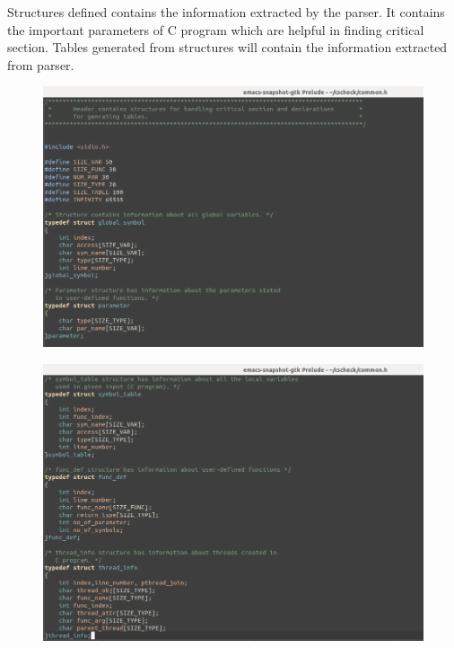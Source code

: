 Structures defined contains the information extracted by the parser.		
It contains the important parameters of C program which are helpful		
in finding critical section. Tables generated from structures will		
contain the information extracted from parser.	
\begin{figure}[H]
\centering
\includegraphics[scale=0.4]{Snaps/common_1.png}
\label{<<Label>>}
\end{figure}

\begin{figure}[H]
\centering
\includegraphics[scale=0.4]{Snaps/common_2.png}
\label{<<Label>>}
\end{figure}

